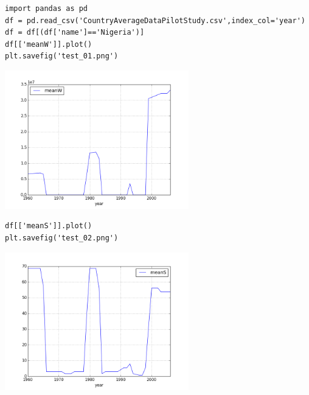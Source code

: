 \documentclass[12pt,fleqn]{article}\usepackage{../common}
\begin{document}
\begin{verbatim}
import pandas as pd
df = pd.read_csv('CountryAverageDataPilotStudy.csv',index_col='year')
df = df[(df['name']=='Nigeria')]
df[['meanW']].plot()
plt.savefig('test_01.png')
\end{verbatim}

\includegraphics[height=6cm]{test_01.png}

\begin{verbatim}
df[['meanS']].plot()
plt.savefig('test_02.png')
\end{verbatim}

\includegraphics[height=6cm]{test_02.png}
\end{document}
